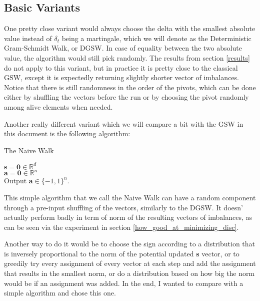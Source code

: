 \documentclass[12pt]{article}
\begin{document}
\subsection{Basic Variants}\label{basic_variants}
One pretty close variant would always choose the delta with the smallest absolute value instead of $\delta_t$ being a martingale, which we will denote as the Deterministic Gram-Schmidt Walk, or DGSW. In case of equality between the two absolute value, the algorithm would still pick randomly. The results from section \ref{results} do not apply to this variant, but in practice it is pretty close to the classical GSW, except it is expectedly returning slightly shorter vector of imbalances. Notice that there is still randomness in the order of the pivots, which can be done either by shuffling the vectors before the run or by choosing the pivot randomly among alive elements when needed.

Another really different variant which we will compare a bit with the GSW in this document is the following algorithm:

\begin{algorithm}[H]\label{naivewalk}
{\fontsize{10}{12}
\caption{The Naive Walk}
   $\textbf{s}=\textbf{0}\in\mathbb{R}^d$\\
   $\textbf{a}=\textbf{0}\in\mathbb{R}^n$\\
    Output $\textbf{a}\in\{-1,1\}^n$.
    }%
    \end{algorithm}
This simple algorithm that we call the Naive Walk can have a random component through a pre-input shuffling of the vectors, similarly to the DGSW. It doesn' actually perform badly in term of norm of the resulting vectors of imbalances, as can be seen via the experiment in section \ref{how_good_at_minimizing_disc}.

Another way to do it would be to choose the sign according to a distribution that is inversely proportional to the norm of the potential updated $\textbf{s}$ vector, or to greedily try every assignment of every vector at each step and add the assignment that results in the smallest norm, or do a distribution based on how big the norm would be if an assignment was added. In the end, I wanted to compare with a simple algorithm and chose this one.
\end{document}
